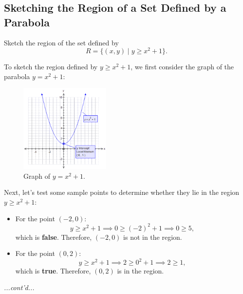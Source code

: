 \documentclass{article}
\begin{document}
\subsection*{Sketching the Region of a Set Defined by a Parabola}
\begin{examplebox}
Sketch the region of the set defined by
\[
    R = \{ (x, y) \mid y \geq x^2 + 1 \}.
\]

\begin{remarkbox}
    To sketch the region defined by \( y \geq x^2 + 1 \), we first consider the graph of the parabola \( y = x^2 + 1 \):
    
    \begin{figure}[H]
        \centering
        \includegraphics[width=0.4\textwidth]{x^2 + 1.png}
        \caption{Graph of \( y = x^2 + 1 \).}
        \label{fig:parabola_graph}
    \end{figure}
    
    Next, let’s test some sample points to determine whether they lie in the region \( y \geq x^2 + 1 \):  
    
    \begin{itemize}
        \item For the point \( (-2, 0) \):  
        \[
        y \geq x^2 + 1 \implies 0 \geq (-2)^2 + 1 \implies 0 \geq 5,
        \]
        which is \textbf{false}. Therefore, \( (-2, 0) \) is not in the region.
        
        \item For the point \( (0, 2) \):  
        \[
        y \geq x^2 + 1 \implies 2 \geq 0^2 + 1 \implies 2 \geq 1,
        \]
        which is \textbf{true}. Therefore, \( (0, 2) \) is in the region.
    \end{itemize}
\end{remarkbox}

\textit{...cont'd...}
\end{examplebox}
\end{document}
